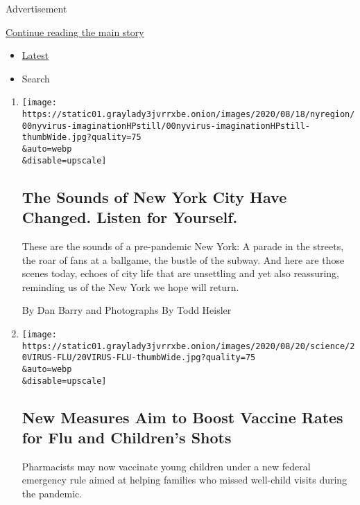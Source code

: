 Advertisement

\protect\hyperlink{after-mid1}{Continue reading the main story}

\begin{itemize}
\tightlist
\item
  \protect\hyperlink{stream-panel}{Latest}
\item
  Search
\end{itemize}

\begin{enumerate}
\def\labelenumi{\arabic{enumi}.}
\item
  \href{/interactive/2020/08/20/nyregion/nyc-sights-sounds-coronavirus.html}{}

  \texttt{[image: https://static01.graylady3jvrrxbe.onion/images/2020/08/18/nyregion/00nyvirus-imaginationHPstill/00nyvirus-imaginationHPstill-thumbWide.jpg?quality=75\\\&auto=webp\\\&disable=upscale]}

  \hypertarget{the-sounds-of-new-york-city-have-changed-listen-for-yourself}{%
  \subsection{The Sounds of New York City Have Changed. Listen for
  Yourself.}\label{the-sounds-of-new-york-city-have-changed-listen-for-yourself}}

  These are the sounds of a pre-pandemic New York: A parade in the
  streets, the roar of fans at a ballgame, the bustle of the subway. And
  here are those scenes today, echoes of city life that are unsettling
  and yet also reassuring, reminding us of the New York we hope will
  return.

  By Dan Barry and Photographs By Todd Heisler
\item
  \href{/2020/08/20/health/coronavirus-flu-vaccine.html}{}

  \texttt{[image: https://static01.graylady3jvrrxbe.onion/images/2020/08/20/science/20VIRUS-FLU/20VIRUS-FLU-thumbWide.jpg?quality=75\\\&auto=webp\\\&disable=upscale]}

  \hypertarget{new-measures-aim-to-boost-vaccine-rates-for-flu-and-childrens-shots}{%
  \subsection{New Measures Aim to Boost Vaccine Rates for Flu and
  Children's
  Shots}\label{new-measures-aim-to-boost-vaccine-rates-for-flu-and-childrens-shots}}

  Pharmacists may now vaccinate young children under a new federal
  emergency rule aimed at helping families who missed well-child visits
  during the pandemic.


\end{enumerate}
